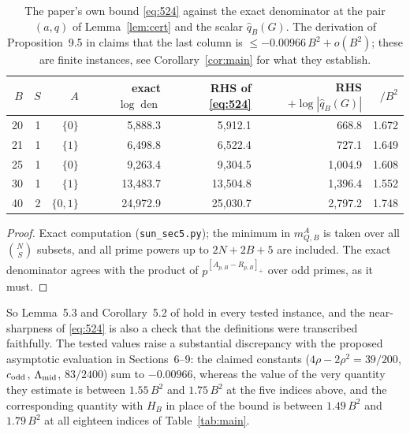 \documentclass[11pt]{amsart}
\theoremstyle{definition}
\newcommand{\qhat}{\widehat{q}}
\DeclareMathOperator{\den}{den}
\begin{document}
\begin{table}[ht]\centering\small
\caption{The paper's own bound \eqref{eq:524} against the exact denominator at the pair $(a,q)$ of Lemma~\ref{lem:cert} and the scalar $\qhat_B(G)$.
The derivation of Proposition~9.5 in \cite{Sun26} claims that the last column is $\le-0.00966\,B^2+o(B^2)$;
these are finite instances, see Corollary~\ref{cor:main} for what they establish.}\label{tab:524}
\begin{tabular}{@{}rrrrrrr@{}}\toprule
$B$ & $S$ & $A$ & exact $\log\den$ & RHS of \eqref{eq:524} & RHS $+\log|\qhat_B(G)|$ & $/B^2$\\\midrule
20 & 1 & $\{0\}$ & 5{,}888.3 & 5{,}912.1 & 668.8 & 1.672\\
21 & 1 & $\{1\}$ & 6{,}498.8 & 6{,}522.4 & 727.1 & 1.649\\
25 & 1 & $\{0\}$ & 9{,}263.4 & 9{,}304.5 & 1{,}004.9 & 1.608\\
30 & 1 & $\{1\}$ & 13{,}483.7 & 13{,}504.8 & 1{,}396.4 & 1.552\\
40 & 2 & $\{0,1\}$ & 24{,}972.9 & 25{,}030.7 & 2{,}797.2 & 1.748\\
\bottomrule\end{tabular}\end{table}

\begin{proof}
Exact computation (\texttt{sun\_sec5.py}); the minimum in $m^A_{Q,B}$ is taken over all $\binom NS$ subsets, and
all prime powers up to $2N+2B+5$ are included. The exact denominator agrees with the product of
$p^{[A_{p,B}-R_{p,B}]_+}$ over odd primes, as it must.
\end{proof}

So Lemma~5.3 and Corollary~5.2 of \cite{Sun26} hold in every tested instance, and the near-sharpness of
\eqref{eq:524} is also a check that the definitions were transcribed faithfully. The tested values raise a substantial discrepancy with the proposed asymptotic evaluation in Sections~6--9: the claimed constants ($4\rho-2\rho^2=39/200$, $c_{\rm odd}$,
$\Lambda_{\rm mid}$, $83/2400$) sum to $-0.00966$, whereas the value of the very quantity they estimate is between
$1.55\,B^2$ and $1.75\,B^2$ at the five indices above, and the corresponding quantity with $H_B$ in place of the
bound is between $1.49\,B^2$ and $1.79\,B^2$ at all eighteen indices of Table~\ref{tab:main}.
\end{document}
